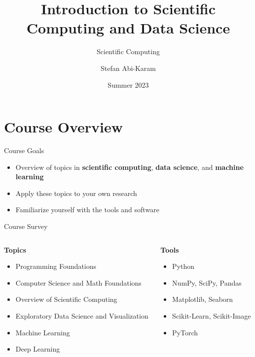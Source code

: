\documentclass[aspectratio=169]{beamer}
\title{Introduction to Scientific Computing and Data Science}
\subtitle{Scientific Computing}
\author{Stefan Abi-Karam}
\date{Summer 2023}
\begin{document}
\begin{frame}
    \titlepage
\end{frame}


\section{Course Overview}

\begin{frame}{Course Goals}

    \begin{itemize}
        \item Overview of topics in \textbf{scientific computing}, \textbf{data science}, and \textbf{machine learning}
        \item Apply these topics to your own research
        \item Familiarize yourself with the tools and software
    \end{itemize}
\end{frame}

\begin{frame}{Course Survey}

    \begin{columns}[t]
        \begin{column}{0.5\textwidth}
            \textbf{Topics}
            \begin{itemize}
                \item Programming Foundations
                \item Computer Science and Math Foundations
                \item Overview of Scientific Computing
                \item Exploratory Data Science and Visualization
                \item Machine Learning
                \item Deep Learning
            \end{itemize}
        \end{column}
        \begin{column}{0.5\textwidth}
            \textbf{Tools}
            \begin{itemize}
                \item Python
                \item NumPy, SciPy, Pandas
                \item Matplotlib, Seaborn
                \item Scikit-Learn, Scikit-Image
                \item PyTorch
            \end{itemize}
        \end{column}
    \end{columns}

\end{frame}
\end{document}
